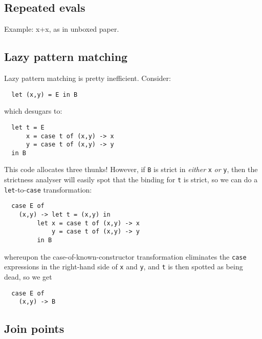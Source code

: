 \documentclass[11pt]{article}
\begin{document}
\subsection{Repeated evals}
\label{sect:repeated-evals}

Example: x+x, as in unboxed paper.


\subsection{Lazy pattern matching}

Lazy pattern matching is pretty inefficient.  Consider:
\begin{lstlisting}
  let (x,y) = E in B
\end{lstlisting}
which desugars to:
\begin{lstlisting}
  let t = E
      x = case t of (x,y) -> x
      y = case t of (x,y) -> y
  in B
\end{lstlisting}
This code allocates three thunks!  However, if \texttt{B} is strict in {\em either}
\texttt{x} {\em or} \texttt{y}, then the strictness analyser will easily spot that
the binding for \texttt{t} is strict, so we can do a \texttt{let}-to-\texttt{case} transformation:
\begin{lstlisting}
  case E of
    (x,y) -> let t = (x,y) in
	     let x = case t of (x,y) -> x
	         y = case t of (x,y) -> y
	     in B
\end{lstlisting}
whereupon the case-of-known-constructor transformation 
eliminates the \texttt{case} expressions in the right-hand side of \texttt{x} and \texttt{y},
and \texttt{t} is then spotted as being dead, so we get
\begin{lstlisting}
  case E of
    (x,y) -> B
\end{lstlisting}

\subsection{Join points}
\label{sect:join-points}
\end{document}
